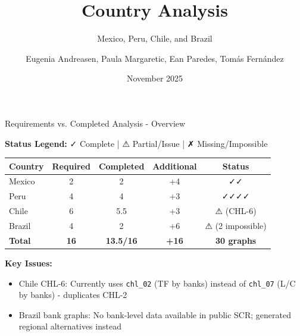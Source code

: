 \documentclass[aspectratio=169,11pt]{beamer}
\title{Country Analysis}
\subtitle{Mexico, Peru, Chile, and Brazil}
\author{Eugenia Andreasen, Paula Margaretic, Ean Paredes, Tomás Fernández}
\date{November 2025}
\begin{document}
\begin{frame}
\titlepage
\end{frame}


\begin{frame}{Requirements vs. Completed Analysis - Overview}
\footnotesize

\textbf{Status Legend:} \textcolor{green!60!black}{✓ Complete} | \textcolor{orange!80!black}{⚠ Partial/Issue} | \textcolor{red!80!black}{✗ Missing/Impossible}

\vspace{0.3cm}

\begin{table}[h]
\centering
\begin{tabular}{lcccc}
\toprule
\textbf{Country} & \textbf{Required} & \textbf{Completed} & \textbf{Additional} & \textbf{Status} \\
\midrule
Mexico  & 2 & 2 & +4 & \textcolor{green!60!black}{✓✓} \\
Peru    & 4 & 4 & +3 & \textcolor{green!60!black}{✓✓✓✓} \\
Chile   & 6 & 5.5 & +3 & \textcolor{orange!80!black}{⚠} (CHL-6) \\
Brazil  & 4 & 2 & +6 & \textcolor{orange!80!black}{⚠} (2 impossible) \\
\midrule
\textbf{Total} & \textbf{16} & \textbf{13.5/16} & \textbf{+16} & \textbf{30 graphs} \\
\bottomrule
\end{tabular}
\end{table}

\vspace{0.2cm}

\textbf{Key Issues:}
\begin{itemize}
    \item \textcolor{orange!80!black}{Chile CHL-6:} Currently uses \texttt{chl\_02} (TF by banks) instead of \texttt{chl\_07} (L/C by banks) - duplicates CHL-2
    \item \textcolor{red!80!black}{Brazil bank graphs:} No bank-level data available in public SCR; generated regional alternatives instead
\end{itemize}

\end{frame}
\end{document}
